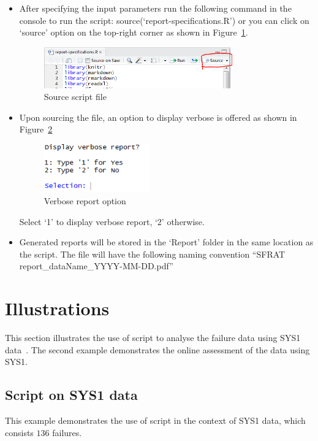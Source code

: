\documentclass[conference]{IEEEtran}
\begin{document}
\begin{itemize}
  \item{After specifying the input parameters run the following command in the console to run the script: source(‘report-specifications.R’) or you can click on ‘source’ option on the top-right corner as shown in Figure~\ref{fig:scriptsource}.
        \begin{figure}[!h]
        \centering
        \includegraphics[width=3.2in]{Figures/scriptsource}
        \caption{Source script file}
        \label{fig:scriptsource}
        \end{figure}
  }

  \item{Upon sourcing the file, an option to display verbose is offered as shown in Figure~\ref{fig:verbose}
        \begin{figure}[!h]
        \centering
        \includegraphics[width=1.8in]{Figures/verbose}
        \caption{Verbose report option}
        \label{fig:verbose}
        \end{figure}

  \noindent Select ‘1’ to display verbose report, `2' otherwise.
  }
  \item {Generated reports will be stored in the `Report' folder in the same location as the script. The file will have the following naming convention ``SFRAT report\_dataName\_YYYY-MM-DD.pdf''}
\end{itemize}


\section{Illustrations}\label{sec:Ex}
This section illustrates the use of script to analyse the failure data using SYS1 data~\cite{BookHoSRE}. The second example demonstrates the online assessment of the data using SYS1.

\subsection{Script on SYS1 data}\label{sec:Ex:Script}
This example demonstrates the use of script in the context of SYS1 data, which consists $136$ failures. 
\end{document}
